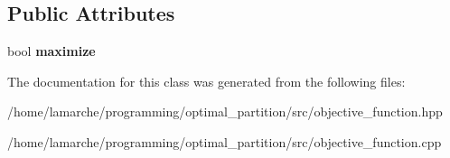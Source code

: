 \subsection*{Public Attributes}
\begin{DoxyCompactItemize}
\item 
\hypertarget{classObjectiveFunction_a325f3c8284ebfac0a170e0b8143dd7b5}{bool {\bfseries maximize}}\label{classObjectiveFunction_a325f3c8284ebfac0a170e0b8143dd7b5}

\end{DoxyCompactItemize}


The documentation for this class was generated from the following files\-:\begin{DoxyCompactItemize}
\item 
/home/lamarche/programming/optimal\-\_\-partition/src/objective\-\_\-function.\-hpp\item 
/home/lamarche/programming/optimal\-\_\-partition/src/objective\-\_\-function.\-cpp\end{DoxyCompactItemize}
